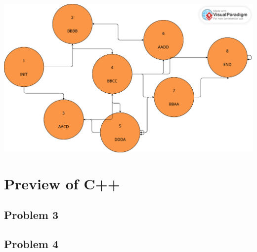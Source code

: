 \documentclass{report}
\begin{document}
\includegraphics[scale=0.23]{graph}









\chapter{Preview of C++}

\section{Problem 3}

\section{Problem 4}
\end{document}
